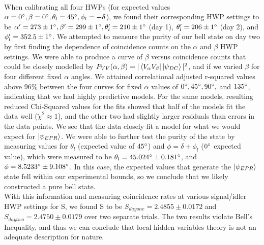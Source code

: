 \documentclass{article}
\begin{document}
    \\\indent When calibrating all four HWPs (for expected values $\alpha = 0\degree,\beta = 0\degree, \theta_l = 45\degree, \phi_l = -\delta$), we found their corresponding HWP settings to be $\alpha'=273\pm 1\degree,\beta'=299\pm 1\degree, \theta_l' = 210\pm 1\degree$ (day 1), $\theta_l' = 206\pm 1\degree$ (day 2), and $\phi_l' = 352.5\pm 1\degree$. We attempted to measure the purity of our bell state on day two by first finding the dependence of coincidence counts on the $\alpha$ and $\beta$ HWP settings. We were able to produce a curve of $\beta$ versus coincidence counts that could be closely modelled by $P_{VV}(\alpha,\beta) = |\left\langle{V_\alpha V_\beta}\right\vert\left\vert{\psi_{DC}}\right\rangle|^2$, and if we varied $\beta$ for four different fixed $\alpha$ angles. We attained correlational adjusted r-squared values above $96\%$ between the four curves for fixed $\alpha$ values of $0\degree,45\degree,90\degree,$ and $135\degree$, indicating that we had highly predictive models. For the same models, resulting reduced Chi-Squared values for the fits showed that half of the models fit the data well ($\tilde{\chi}^2\approx 1$), and the other two had slightly larger residuals than errors in the data points. We see that the data closely fit a model for what we would expect for $\left\vert{\psi_{EPR}}\right\rangle$. We were able to further test the purity of the state by measuring values for $\theta_l$ (expected value of $45\degree$) and $\phi = \delta + \phi_l$ ($0\degree$ expected value), which were measured to be $\theta_l = 45.024\degree \pm 0.181 \degree$, and $\phi = 8.5233\degree \pm 9.108\degree$. In this case, the expected values that generate the $\left\vert{\psi_{EPR}}\right\rangle$ state fell within our experimental bounds, so we conclude that we likely constructed a pure bell state.
    \\\indent With this information and measuring coincidence rates at various signal/idler HWP settings for S, we found S to be $S_{day one} = 2.4855 \pm 0.0172$ and $S_{day two} = 2.4750 \pm 0.0179$ over two separate trials. The two results violate Bell's Inequality, and thus we can conclude that local hidden variables theory is not an adequate description for nature. 
\end{document}
